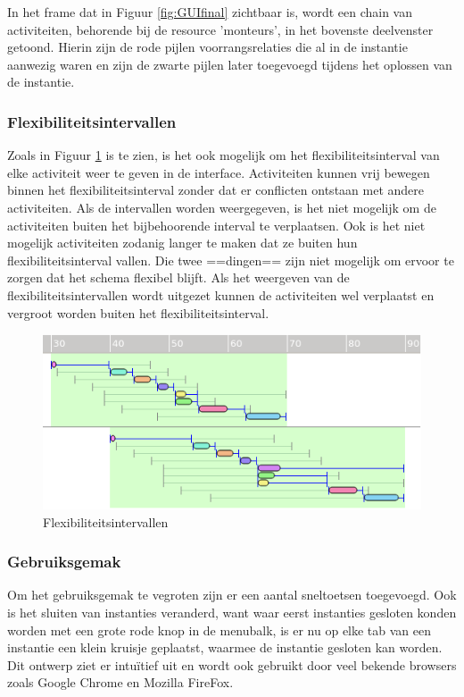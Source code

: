 In het frame dat in Figuur \ref{fig:GUIfinal} zichtbaar is, wordt een chain van activiteiten, behorende bij de resource 'monteurs', in het bovenste deelvenster getoond. Hierin zijn de rode pijlen voorrangsrelaties die al in de instantie aanwezig waren en zijn de zwarte pijlen later toegevoegd tijdens het oplossen van de instantie.


\subsubsection*{Flexibiliteitsintervallen}
Zoals in Figuur \ref{fig:flex-interval} is te zien, is het ook mogelijk om het flexibiliteitsinterval van elke activiteit weer te geven in de interface. Activiteiten kunnen vrij bewegen binnen het flexibiliteitsinterval zonder dat er conflicten ontstaan met andere activiteiten. Als de intervallen worden weergegeven, is het niet mogelijk om de activiteiten buiten het bijbehoorende interval te verplaatsen. Ook is het niet mogelijk activiteiten zodanig langer te maken dat ze buiten hun flexibiliteitsinterval vallen. Die twee ==dingen== zijn niet mogelijk om ervoor te zorgen dat het schema flexibel blijft. Als het weergeven van de flexibiliteitsintervallen wordt uitgezet kunnen de activiteiten wel verplaatst en vergroot worden buiten het flexibiliteitsinterval.

\begin{figure}[H]
\center
\includegraphics[width=.7\textwidth]{../images/flex-interval.png}
\caption{Flexibiliteitsintervallen}
\label{fig:flex-interval}
\end{figure}

\subsubsection*{Gebruiksgemak}
Om het gebruiksgemak te vegroten zijn er een aantal sneltoetsen toegevoegd. Ook is het sluiten van instanties veranderd, want waar eerst instanties gesloten konden worden met een grote rode knop in de menubalk, is er nu op elke tab van een instantie een klein kruisje geplaatst, waarmee de instantie gesloten kan worden. Dit ontwerp ziet er intu\"itief uit en wordt ook gebruikt door veel bekende browsers zoals Google Chrome en Mozilla FireFox.

